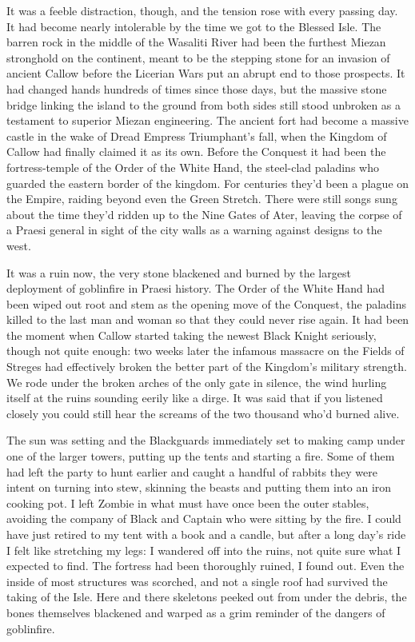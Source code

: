 \documentclass[12pt, openany]{book}
\begin{document}
It was a feeble distraction, though, and the tension rose with every passing day. It had become nearly intolerable by the time we got to the Blessed Isle. The barren rock in the middle of the Wasaliti River had been the furthest Miezan stronghold on the continent, meant to be the stepping stone for an invasion of ancient Callow before the Licerian Wars put an abrupt end to those prospects. It had changed hands hundreds of times since those days, but the massive stone bridge linking the island to the ground from both sides still stood unbroken as a testament to superior Miezan engineering. The ancient fort had become a massive castle in the wake of Dread Empress Triumphant’s fall, when the Kingdom of Callow had finally claimed it as its own. Before the Conquest it had been the fortress-temple of the Order of the White Hand, the steel-clad paladins who guarded the eastern border of the kingdom. For centuries they’d been a plague on the Empire, raiding beyond even the Green Stretch. There were still songs sung about the time they’d ridden up to the Nine Gates of Ater, leaving the corpse of a Praesi general in sight of the city walls as a warning against designs to the west.

It was a ruin now, the very stone blackened and burned by the largest deployment of goblinfire in Praesi history. The Order of the White Hand had been wiped out root and stem as the opening move of the Conquest, the paladins killed to the last man and woman so that they could never rise again. It had been the moment when Callow started taking the newest Black Knight seriously, though not quite enough: two weeks later the infamous massacre on the Fields of Streges had effectively broken the better part of the Kingdom’s military strength. We rode under the broken arches of the only gate in silence, the wind hurling itself at the ruins sounding eerily like a dirge. It was said that if you listened closely you could still hear the screams of the two thousand who’d burned alive.

The sun was setting and the Blackguards immediately set to making camp under one of the larger towers, putting up the tents and starting a fire. Some of them had left the party to hunt earlier and caught a handful of rabbits they were intent on turning into stew, skinning the beasts and putting them into an iron cooking pot. I left Zombie in what must have once been the outer stables, avoiding the company of Black and Captain who were sitting by the fire. I could have just retired to my tent with a book and a candle, but after a long day’s ride I felt like stretching my legs: I wandered off into the ruins, not quite sure what I expected to find. The fortress had been thoroughly ruined, I found out. Even the inside of most structures was scorched, and not a single roof had survived the taking of the Isle. Here and there skeletons peeked out from under the debris, the bones themselves blackened and warped as a grim reminder of the dangers of goblinfire. 
\end{document}
